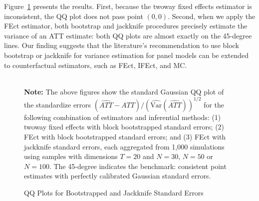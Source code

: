 \documentclass[12pt]{article}
\let\oldcenter\center
\let\oldendcenter\endcenter
\renewenvironment{center}{\setlength\topsep{0pt}\oldcenter}{\oldendcenter}
\begin{document}
Figure~\ref{fg:sim.inference} presents the results. First, because the twoway fixed effects estimator is inconsistent, the QQ plot does not pass point $(0, 0)$. Second, when we apply the FEct estimator, both bootstrap and jackknife procedures precisely estimate the variance of an ATT estimate: both QQ plots are almost exactly on the 45-degree lines. Our finding suggests that the literature's recommendation to use block bootstrap or jackknife for variance estimation for panel models \citep{howmuch2004,cameron2015} can be extended to counterfactual estimators, such as FEct, IFEct, and MC.
\clearpage

\begin{figure}[!ht]
\caption{QQ Plots for Bootstrapped and Jackknife Standard Errors}\label{fg:sim.inference}
\centering
\begin{minipage}{0.95\linewidth}
\begin{center}
\hspace{-2em}
\\
\end{center}
\footnotesize\textbf{Note:} The above figures show the standard Gaussian QQ plot of the standardize errors $(\widehat{ATT} - ATT)/(\widehat{\mathrm{Var}}(\widehat{ATT}))^{1/2}$ for the following combination of estimators and inferential methods: (1) twoway fixed effects with block bootstrapped standard errors; (2) FEct with block bootstrapped standard errors; and (3) FEct with jackknife standard errors, each aggregated from 1,000 simulations using samples with dimensions $T = 20$ and $N = 30$, $N = 50$ or $N = 100$. The 45-degree indicates the benchmark: consistent point estimates with perfectly calibrated Gaussian standard errors. 
\end{minipage}
\end{figure}
\clearpage 
\end{document}

